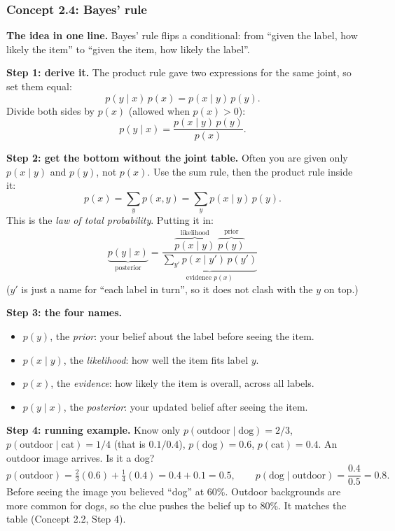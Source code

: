\documentclass[12pt,a4paper]{article}
\begin{document}
\subsubsection{Concept 2.4: Bayes' rule}\label{c2-4}

\textbf{The idea in one line.} Bayes' rule flips a conditional: from ``given the label, how likely the item'' to ``given the item, how likely the label''.

\textbf{Step 1: derive it.} The product rule gave two expressions for the same joint, so set them equal:
\[
p(y\mid x)\,p(x)=p(x\mid y)\,p(y).
\]
Divide both sides by $p(x)$ (allowed when $p(x)>0$):
\[
p(y\mid x)=\frac{p(x\mid y)\,p(y)}{p(x)} .
\]

\textbf{Step 2: get the bottom without the joint table.} Often you are given only $p(x\mid y)$ and $p(y)$, not $p(x)$. Use the sum rule, then the product rule inside it:
\[
p(x)=\sum_y p(x,y)=\sum_y p(x\mid y)\,p(y).
\]
This is the \emph{law of total probability}. Putting it in:
\[
\underbrace{p(y\mid x)}_{\text{posterior}}=\frac{\overbrace{p(x\mid y)}^{\text{likelihood}}\;\overbrace{p(y)}^{\text{prior}}}{\underbrace{\sum_{y'}p(x\mid y')\,p(y')}_{\text{evidence }p(x)}}
\]
($y'$ is just a name for ``each label in turn'', so it does not clash with the $y$ on top.)

\textbf{Step 3: the four names.}
\begin{itemize}[nosep]
  \item $p(y)$, the \emph{prior}: your belief about the label before seeing the item.
  \item $p(x\mid y)$, the \emph{likelihood}: how well the item fits label $y$.
  \item $p(x)$, the \emph{evidence}: how likely the item is overall, across all labels.
  \item $p(y\mid x)$, the \emph{posterior}: your updated belief after seeing the item.
\end{itemize}

\textbf{Step 4: running example.} Know only $p(\text{outdoor}\mid\text{dog})=2/3$, $p(\text{outdoor}\mid\text{cat})=1/4$ (that is $0.1/0.4$), $p(\text{dog})=0.6$, $p(\text{cat})=0.4$. An outdoor image arrives. Is it a dog?
\[
p(\text{outdoor})=\tfrac23(0.6)+\tfrac14(0.4)=0.4+0.1=0.5,\qquad
p(\text{dog}\mid\text{outdoor})=\frac{0.4}{0.5}=0.8 .
\]
Before seeing the image you believed ``dog'' at 60\%. Outdoor backgrounds are more common for dogs, so the clue pushes the belief up to 80\%. It matches the table (Concept 2.2, Step 4).
\end{document}
